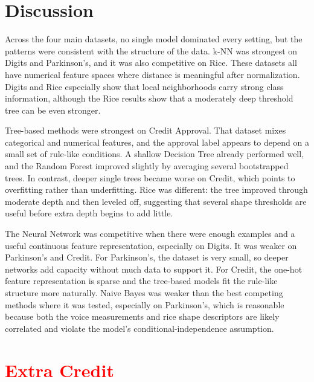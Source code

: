 \documentclass[11pt]{article}
\begin{document}
\section{Discussion}

Across the four main datasets, no single model dominated every setting, but the patterns
were consistent with the structure of the data. k-NN was strongest on Digits and
Parkinson's, and it was also competitive on Rice. These datasets all have numerical
feature spaces where distance is meaningful after normalization. Digits and Rice
especially show that local neighborhoods carry strong class information, although the
Rice results show that a moderately deep threshold tree can be even stronger.

Tree-based methods were strongest on Credit Approval. That dataset mixes categorical and
numerical features, and the approval label appears to depend on a small set of rule-like
conditions. A shallow Decision Tree already performed well, and the Random Forest improved
slightly by averaging several bootstrapped trees. In contrast, deeper single trees became
worse on Credit, which points to overfitting rather than underfitting. Rice was different:
the tree improved through moderate depth and then leveled off, suggesting that several
shape thresholds are useful before extra depth begins to add little.

The Neural Network was competitive when there were enough examples and a useful continuous
feature representation, especially on Digits. It was weaker on Parkinson's and Credit.
For Parkinson's, the dataset is very small, so deeper networks add capacity without much
data to support it. For Credit, the one-hot feature representation is sparse and the
tree-based models fit the rule-like structure more naturally. Naive Bayes was weaker than
the best competing methods where it was tested, especially on Parkinson's, which is
reasonable because both the voice measurements and rice shape descriptors are likely
correlated and violate the model's conditional-independence assumption.

\section{\textcolor{red}{Extra Credit}}
\end{document}
